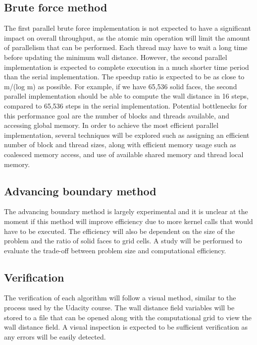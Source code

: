 \documentclass[]{aiaa-tc}%
\begin{document}
\subsection{Brute force method}
The first parallel brute force implementation is not expected to have a significant impact on overall throughput, as the atomic min operation will limit the amount of parallelism that can be performed.  Each thread may have to wait a long time before updating the minimum wall distance.  However, the second parallel implementation is expected to complete execution in a much shorter time period than the serial implementation.  The speedup ratio is expected to be as close to m/(log m) as possible.  For example, if we have 65,536 solid faces, the second parallel implementation should be able to compute the wall distance in 16 steps, compared to 65,536 steps in the serial implementation. Potential bottlenecks for this performance goal are the number of blocks and threads available, and accessing global memory. In order to achieve the most efficient parallel implementation, several techniques will be explored such as assigning an efficient number of block and thread sizes, along with efficient memory usage such as coalesced memory access, and use of available shared memory and thread local memory.

\subsection{Advancing boundary method}
The advancing boundary method is largely experimental and it is
unclear at the moment if this method will improve efficiency due to
more kernel calls that would have to be executed. The efficiency will
also be dependent on the size of the problem and the ratio of solid
faces to grid cells. A study will be performed to evaluate the
trade-off between problem size and computational efficiency.

\subsection{Verification}
The verification of each algorithm will follow a visual method,
similar to the process used by the Udacity course. The wall distance
field variables will be stored to a file that can be opened along with
the computational grid to view the wall distance field. A visual
inspection is expected to be sufficient verification as any errors will
be easily detected.
\end{document}
